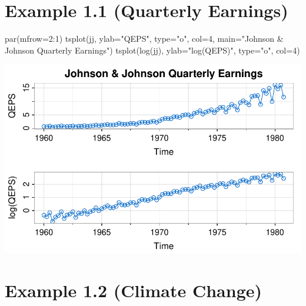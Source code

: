 \documentclass[
  letterpaper,
  DIV=11,
  numbers=noendperiod]{scrreprt}
\newenvironment{Shaded}{\begin{snugshade}}{\end{snugshade}}
\newcommand{\AttributeTok}[1]{\textcolor[rgb]{0.40,0.45,0.13}{#1}}
\newcommand{\DecValTok}[1]{\textcolor[rgb]{0.68,0.00,0.00}{#1}}
\newcommand{\FunctionTok}[1]{\textcolor[rgb]{0.28,0.35,0.67}{#1}}
\newcommand{\NormalTok}[1]{\textcolor[rgb]{0.00,0.23,0.31}{#1}}
\newcommand{\SpecialCharTok}[1]{\textcolor[rgb]{0.37,0.37,0.37}{#1}}
\newcommand{\StringTok}[1]{\textcolor[rgb]{0.13,0.47,0.30}{#1}}
\begin{document}
\section{Example 1.1 (Quarterly
Earnings)}\label{example-1.1-quarterly-earnings}

\begin{Shaded}
\begin{Highlighting}[]
\FunctionTok{par}\NormalTok{(}\AttributeTok{mfrow=}\DecValTok{2}\SpecialCharTok{:}\DecValTok{1}\NormalTok{)}
\FunctionTok{tsplot}\NormalTok{(jj, }\AttributeTok{ylab=}\StringTok{"QEPS"}\NormalTok{, }\AttributeTok{type=}\StringTok{"o"}\NormalTok{, }\AttributeTok{col=}\DecValTok{4}\NormalTok{, }\AttributeTok{main=}\StringTok{"Johnson \& Johnson Quarterly Earnings"}\NormalTok{)}
\FunctionTok{tsplot}\NormalTok{(}\FunctionTok{log}\NormalTok{(jj), }\AttributeTok{ylab=}\StringTok{"log(QEPS)"}\NormalTok{, }\AttributeTok{type=}\StringTok{"o"}\NormalTok{, }\AttributeTok{col=}\DecValTok{4}\NormalTok{)}
\end{Highlighting}
\end{Shaded}

\includegraphics{LectureNotes/Lecture1_files/figure-pdf/ex-1-1-1.pdf}

\section{Example 1.2 (Climate Change)}\label{example-1.2-climate-change}
\end{document}
